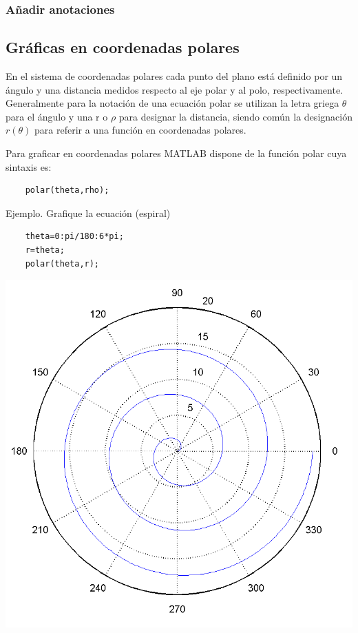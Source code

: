 \subsubsection{Añadir anotaciones}

\subsection{Gráficas en coordenadas polares}

En el sistema de coordenadas polares cada punto del plano está definido por un ángulo y 
una distancia medidos respecto al eje polar y al polo, respectivamente. Generalmente para 
la notación de una ecuación polar se utilizan la letra griega $\theta$ para el ángulo 
y una r o $\rho$ para designar la distancia, siendo común la designación $r(\theta)$ para 
referir a una función en coordenadas polares.

Para graficar en coordenadas polares MATLAB dispone de la función polar cuya sintaxis es:

\begin{verbatim}
	polar(theta,rho);
\end{verbatim}

Ejemplo. Grafique la ecuación   (espiral)

\begin{verbatim}
	theta=0:pi/180:6*pi;
	r=theta;
	polar(theta,r);
\end{verbatim}

\begin{center}
\includegraphics[scale=0.6]{src/ch4/img_4_6.png}
\end{center}

